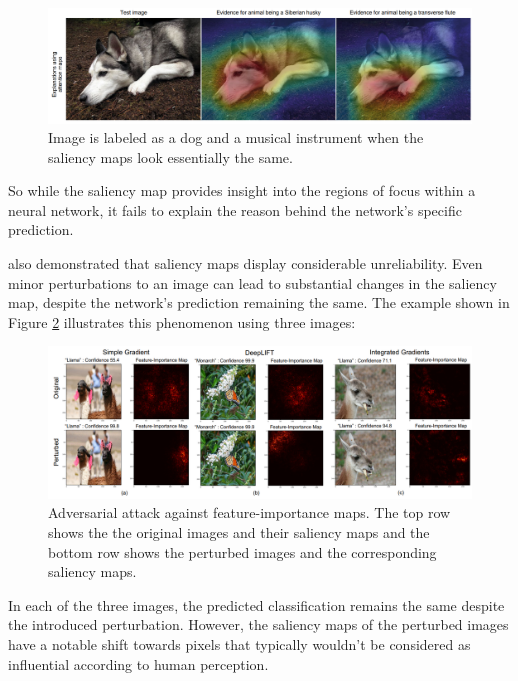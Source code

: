 \begin{figure}[H]
    \centering
    \includegraphics[width=0.9\linewidth]{pics/saliency_husky.png}
    \caption[Image is labeled as a dog and a musical instrument when the saliency maps look essentially the same.]{Image is labeled as a dog and a musical instrument when the saliency maps look essentially the same. \cite{Ghorbani_Abid_Zou_2019}}
    \label{fig:saliency_husky}
\end{figure}

So while the saliency map provides insight into the regions of focus within a neural network, it fails to explain the reason behind the network's specific prediction\cite{rudin2019stop}.

\cite{Ghorbani_Abid_Zou_2019} also demonstrated that saliency maps display considerable unreliability. Even minor perturbations to an image can lead to substantial changes in the saliency map, despite the network's prediction remaining the same. The example shown in Figure \ref{fig:advers} illustrates this phenomenon using three images:

\begin{figure}[H]
    \centering
    \includegraphics[width=0.9\linewidth]{pics/advers.png}
    \caption[Adversarial attack against feature-importance maps.]{Adversarial attack against feature-importance maps. The top row shows the the original images and their saliency maps and the bottom row shows the perturbed images and the corresponding saliency maps.\cite{Ghorbani_Abid_Zou_2019}}
    \label{fig:advers}
\end{figure}

In each of the three images, the predicted classification remains the same despite the introduced perturbation. However, the saliency maps of the perturbed images have a notable shift towards pixels that typically wouldn't be considered as influential according to human perception.
